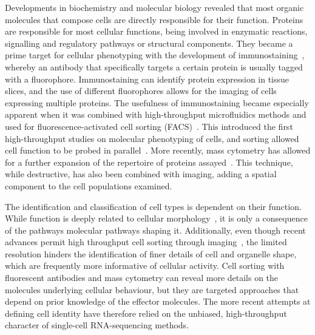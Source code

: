 Developments in biochemistry and molecular biology revealed that most organic molecules that compose cells are directly responsible for their function. Proteins are responsible for most cellular functions, being involved in enzymatic reactions, signalling and regulatory pathways or structural components. They became a prime target for cellular phenotyping with the development of immunostaining~\citep{coons_immunological_1941}, whereby an antibody that specifically targets a certain protein is usually tagged with a fluorophore. Immunostaining can identify protein expression in tissue slices, and the use of different fluorophores allows for the imaging of cells expressing multiple proteins. The usefulness of immunostaining became especially apparent when it was combined with high-throughput microfluidics methods and used for fluorescence-activated cell sorting (FACS)~\citep{bonner_fluorescence_1972}. This introduced the first high-throughput studies on molecular phenotyping of cells, and sorting allowed cell function to be probed in parallel~\citep{julius_demonstration_1972}. More recently, mass cytometry has allowed for a further expansion of the repertoire of proteins assayed~\citep{bandura_mass_2009,di_palma_unraveling_2015}. This technique, while destructive, has also been combined with imaging, adding a spatial component to the cell populations examined.

The identification and classification of cell types is dependent on their function. While function is deeply related to cellular morphology~\citep{prasad_cell_2019}, it is only a consequence of the pathways molecular pathways shaping it. Additionally, even though recent advances permit high throughput cell sorting through imaging~\citep{nitta_intelligent_2018}, the limited resolution hinders the identification of finer details of cell and organelle shape, which are frequently more informative of cellular activity. Cell sorting with fluorescent antibodies and mass cytometry can reveal more details on the molecules underlying cellular behaviour, but they are targeted approaches that depend on prior knowledge of the effector molecules. The more recent attempts at defining cell identity have therefore relied on the unbiased, high-throughput character of single-cell RNA-sequencing methods.



